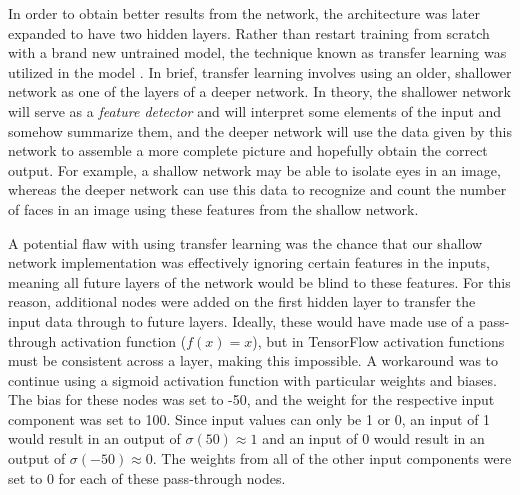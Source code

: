 \documentclass[12pt]{article}
\begin{document}
In order to obtain better results from the network, the architecture was later expanded to have two hidden layers. Rather than restart training from scratch with a brand new untrained model, the technique known as transfer learning was utilized in the model \cite{TransferLearning}. In brief, transfer learning involves using an older, shallower network as one of the layers of a deeper network. In theory, the shallower network will serve as a \textit{feature detector} and will interpret some elements of the input and somehow summarize them, and the deeper network will use the data given by this network to assemble a more complete picture and hopefully obtain the correct output. For example, a shallow network may be able to isolate eyes in an image, whereas the deeper network can use this data to recognize and count the number of faces in an image using these features from the shallow network.

A potential flaw with using transfer learning was the chance that our shallow network implementation was effectively ignoring certain features in the inputs, meaning all future layers of the network would be blind to these features. For this reason, additional nodes were added on the first hidden layer to transfer the input data through to future layers. Ideally, these would have made use of a pass-through activation function ($f(x) = x$), but in TensorFlow activation functions must be consistent across a layer, making this impossible. A workaround was to continue using a sigmoid activation function with particular weights and biases. The bias for these nodes was set to -50, and the weight for the respective input component was set to 100. Since input values can only be 1 or 0, an input of 1 would result in an output of $\sigma(50) \approx 1$ and an input of 0 would result in an output of $\sigma(-50) \approx 0$. The weights from all of the other input components were set to 0 for each of these pass-through nodes.
\end{document}
